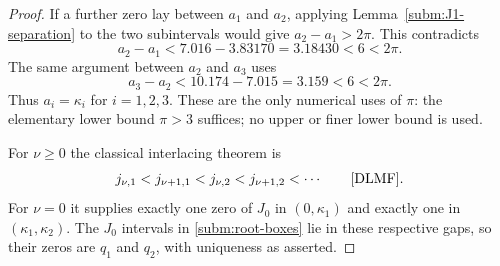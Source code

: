 \documentclass[11pt,letterpaper,reqno]{amsart}
\theoremstyle{definition}
\begin{document}
\begin{proof}
If a further zero lay between $a_1$ and $a_2$, applying
Lemma~\ref{subm:J1-separation} to the two subintervals would give
$a_2-a_1>2\pi$.  This contradicts
\[
 a_2-a_1<7.016-3.83170=3.18430<6<2\pi.
\]
The same argument between $a_2$ and $a_3$ uses
\[
 a_3-a_2<10.174-7.015=3.159<6<2\pi.
\]
Thus $a_i=\kappa_i$ for $i=1,2,3$.  These are the only numerical
uses of $\pi$: the elementary lower bound $\pi>3$ suffices; no
upper or finer lower bound is used.

For $\nu\ge0$ the classical interlacing theorem is
\[
 j_{\nu,1}<j_{\nu+1,1}<j_{\nu,2}<j_{\nu+1,2}<\cdots
 \qquad\text{\cite[Eq.~10.21.2]{DLMF}}.
\]
For $\nu=0$ it supplies exactly one zero of $J_0$ in
$(0,\kappa_1)$ and exactly one in $(\kappa_1,\kappa_2)$.
The $J_0$ intervals in \eqref{subm:root-boxes} lie in these respective
gaps, so their zeros are $q_1$ and $q_2$, with uniqueness as asserted.
\end{proof}
\end{document}
